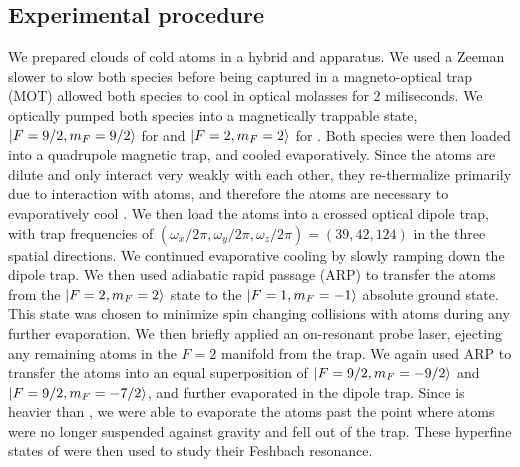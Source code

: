 \documentclass[12pt]{iopart}
\begin{document}
\subsection{Experimental procedure}
We prepared clouds of cold \K{} atoms in a hybrid \K{} and \Rb{} apparatus. We used a Zeeman slower to slow both species before being captured in a magneto-optical trap (MOT) allowed both species to cool in optical molasses for 2 miliseconds. We optically pumped both species into a magnetically trappable state, $\mathinner{|{F=9/2, m_F=9/2}\rangle}$ for \K{} and $\mathinner{|{F=2,m_F=2}\rangle}$ for \Rb{}. Both species were then loaded into a quadrupole magnetic trap, and cooled evaporatively. Since the \K{} atoms are dilute and only interact very weakly with each other, they re-thermalize primarily due to interaction with \Rb{} atoms, and therefore the \Rb{} atoms are necessary to evaporatively cool \K{}. We then load the atoms into a crossed optical dipole trap, with trap frequencies of $(\omega_x/2\pi,\omega_y/2\pi,\omega_z/2\pi) =(39, 42, 124)$ in the three spatial directions. We continued evaporative cooling by slowly ramping down the dipole trap. We then used adiabatic rapid passage (ARP) to transfer the \Rb{} atoms from the $\mathinner{|{F=2, m_F=2}\rangle}$ state to the  $\mathinner{|{F=1, m_F=-1}\rangle}$ absolute ground state. This state was chosen to minimize spin changing collisions with \K{} atoms during any further evaporation.  We then briefly applied an on-resonant probe laser, ejecting any remaining \Rb{} atoms in the $F=2$ manifold from the trap. We again used ARP to transfer the \K{} atoms into an equal superposition of $\mathinner{|{F=9/2,m_F=-9/2}\rangle}$ and $\mathinner{|{F=9/2,m_F=-7/2}\rangle}$, and further evaporated in the dipole trap. Since \Rb{} is heavier than \K{}, we were able to evaporate the \K{} atoms past the point where \Rb{} atoms were no longer suspended against gravity and fell out of the trap.  These hyperfine states of \K{} were then used to study their Feshbach resonance. 
\end{document}
